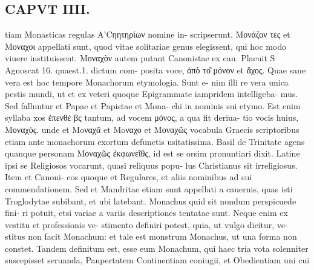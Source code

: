 \documentclass{article}
\begin{document}
\begin{pages}
\section*{CAPVT  IIII. }
\marginpar{[ p.213 ]}tiam Monasticas regulas A'Cηητηρίων nomine in- scripserunt. Μονάζον τες et Μοναχοι appellati sunt, quod vitae solitariae genus elegissent, qui hoc modo viuere instituissent. Μοναχὸν autem putant Canonistae ex can. Placuit S Agnoscat 16. quaest.1. dictum com- posita voce, ἀπὸ το͂ μόνον et ἄχος. Quae sane vera est hoc tempore Monachorum etymologia. Sunt e- nim illi re vera unica pestis mundi, ut et ex veteri quoque Epigrammate iampridem intelligeba- mus. Sed falluntur et Papae et Papistae et Mona- chi in nominis sui etymo. Est enim syllaba xos ἐπενθέ βς tantum, ad vocem μόνος, a qua fit deriua- tio vocis huius, Μοναχὸς. unde et Moναχᾶ et Moναχο et Μοναχῶς vocabula Graecis scriptoribus etiam ante monachorum exortum defunctis usitatissima. Basil de Trinitate agens quanque personam Μοναχῶς ἐκφωνεῖθς, id est se orsim pronuntiari dixit. Latine ipsi se Religiosos vocarunt, quasi reliquus popu- lus Christianus sit irreligiosus. Item et Canoni- cos quoque et Regulares, et aliis nominibus ad sui commendationem. Sed et Mandritae etiam sunt appellati a cauernis, quas isti Troglodytae subibant, et ubi latebant. Monachus quid sit nondum perspicuede fini- ri potuit, etsi variae a variis descriptiones tentatae sunt. Neque enim ex vestitu et professionis ve- stimento definiri potest, quia, ut vulgo dicitur, ve- stitus non facit Monachum: et tale est monstrum Monachus, ut una forma non constet. Tandem definitum est, esse eum Monachum, qui haec tria vota solenniter suscepisset seruanda, Paupertatem Continentiam coniugii, et Obedientiam uni cui 

\end{pages}
\end{document}
